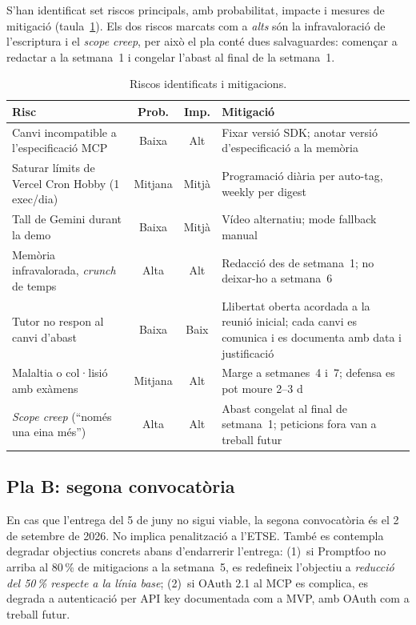 S'han identificat set riscos principals, amb probabilitat, impacte i
mesures de mitigació (taula~\ref{tab:riscos}). Els dos riscos marcats com
a \emph{alts} són la infravaloració de l'escriptura i el
\emph{scope creep}, per això el pla conté dues salvaguardes: començar a
redactar a la setmana~1 i congelar l'abast al final de la setmana~1.

\begin{table}[htbp]
  \centering
  \caption{Riscos identificats i mitigacions.}
  \label{tab:riscos}
  \small
  \begin{tabular}{p{6cm}ccp{5cm}}
    \toprule
    Risc & Prob. & Imp. & Mitigació \\
    \midrule
    Canvi incompatible a l'especificació MCP & Baixa & Alt & Fixar versió SDK; anotar versió d'especificació a la memòria \\
    Saturar límits de Vercel Cron Hobby (1 exec/dia) & Mitjana & Mitjà & Programació diària per auto-tag, weekly per digest \\
    Tall de Gemini durant la demo & Baixa & Mitjà & Vídeo alternatiu; mode fallback manual \\
    Memòria infravalorada, \emph{crunch} de temps & Alta & Alt & Redacció des de setmana~1; no deixar-ho a setmana~6 \\
    Tutor no respon al canvi d'abast & Baixa & Baix & Llibertat oberta acordada a la reunió inicial; cada canvi es comunica i es documenta amb data i justificació \\
    Malaltia o col·lisió amb exàmens & Mitjana & Alt & Marge a setmanes~4 i~7; defensa es pot moure 2--3 d \\
    \emph{Scope creep} (``només una eina més'') & Alta & Alt & Abast congelat al final de setmana~1; peticions fora van a treball futur \\
    \bottomrule
  \end{tabular}
\end{table}

\subsection{Pla B: segona convocatòria}

En cas que l'entrega del 5 de juny no sigui viable, la segona
convocatòria és el 2 de setembre de 2026. No implica penalització a
l'ETSE. També es contempla degradar objectius concrets abans d'endarrerir
l'entrega: (1)~si Promptfoo no arriba al 80\,\% de mitigacions a la
setmana~5, es redefineix l'objectiu a \emph{reducció del 50\,\% respecte
a la línia base}; (2)~si OAuth 2.1 al MCP es complica, es degrada a
autenticació per API key documentada com a MVP, amb OAuth com a treball
futur.
